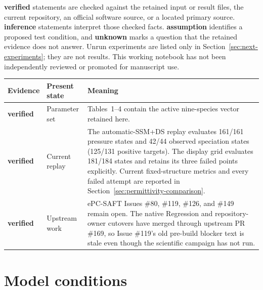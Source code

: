 \documentclass[10pt,oneside]{scrartcl}
\begin{document}
\textbf{verified} statements are checked against the retained input or result
files, the current repository, an official software source, or a located
primary source. \textbf{inference} statements interpret those checked facts.
\textbf{assumption} identifies a proposed test condition, and \textbf{unknown}
marks a question that the retained evidence does not answer. Unrun experiments
are listed only in Section~\ref{sec:next-experiments}; they are not results.
This working notebook has not been independently reviewed or promoted for
manuscript use.

\begin{tabularx}{\textwidth}{@{}p{}p{}Y@{}}
\toprule
Evidence & Present state & Meaning \\
\midrule
\textbf{verified} & Parameter set & Tables~1--4 contain the active
nine-species vector retained here. \\
\textbf{verified} & Current replay & The automatic-SSM+DS replay evaluates
161/161 pressure states and 42/44 observed speciation states (125/131 positive
targets). The display grid evaluates 181/184 states and retains its three
failed points explicitly. Current fixed-structure metrics and every failed
attempt are reported in Section~\ref{sec:permittivity-comparison}. \\
\textbf{verified} & Upstream work & ePC-SAFT Issues \#80, \#119, \#126, and
\#149 remain open. The native Regression and repository-owner cutovers have
merged through upstream PR \#169, so Issue \#119's old pre-build blocker text
is stale even though the scientific campaign has not run. \\
\bottomrule
\end{tabularx}

\section{Model conditions}
\end{document}

